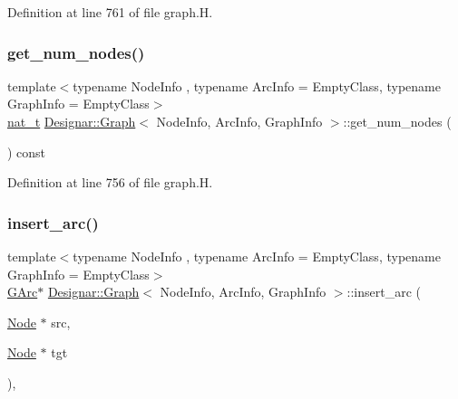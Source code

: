 Definition at line 761 of file graph.\+H.

\mbox{\label{class_designar_1_1_graph_af6f0ef48386dd1353880ff706387c4e8}} 
\subsubsection{\texorpdfstring{get\+\_\+num\+\_\+nodes()}{get\_num\_nodes()}}
{\footnotesize\ttfamily template$<$typename Node\+Info , typename Arc\+Info  = Empty\+Class, typename Graph\+Info  = Empty\+Class$>$ \\
\hyperlink{namespace_designar_aa72662848b9f4815e7bf31a7cf3e33d1}{nat\+\_\+t} \hyperlink{class_designar_1_1_graph}{Designar\+::\+Graph}$<$ Node\+Info, Arc\+Info, Graph\+Info $>$\+::get\+\_\+num\+\_\+nodes (\begin{DoxyParamCaption}{ }\end{DoxyParamCaption}) const\hspace{0.3cm}{\ttfamily [inline]}}



Definition at line 756 of file graph.\+H.

\mbox{\label{class_designar_1_1_graph_a20f183a1481fb62bc775aca6bd3244d1}} 
\subsubsection{\texorpdfstring{insert\+\_\+arc()}{insert\_arc()}\hspace{0.1cm}{\footnotesize\ttfamily [1/4]}}
{\footnotesize\ttfamily template$<$typename Node\+Info , typename Arc\+Info  = Empty\+Class, typename Graph\+Info  = Empty\+Class$>$ \\
\hyperlink{class_designar_1_1_graph_a5ad9e18b71899c2d4979426e367e5573}{G\+Arc}$\ast$ \hyperlink{class_designar_1_1_graph}{Designar\+::\+Graph}$<$ Node\+Info, Arc\+Info, Graph\+Info $>$\+::insert\+\_\+arc (\begin{DoxyParamCaption}\item[{\hyperlink{class_designar_1_1_graph_a5dfc7dba9d092ac489c72e40390c37d0}{Node} $\ast$}]{src,  }\item[{\hyperlink{class_designar_1_1_graph_a5dfc7dba9d092ac489c72e40390c37d0}{Node} $\ast$}]{tgt }\end{DoxyParamCaption})\hspace{0.3cm}{\ttfamily [inline]}, {\ttfamily [protected]}}



